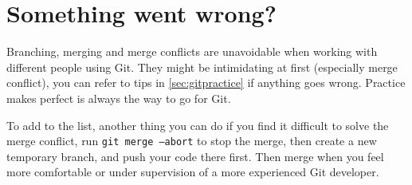 


\section{Something went wrong?}

Branching, merging and merge conflicts are unavoidable when working with different people using Git. They might be intimidating at first (especially merge conflict), you can refer to tips in \cref{sec:gitpractice} if anything goes wrong. Practice makes perfect is always the way to go for Git. 

To add to the list, another thing you can do if you find it difficult to solve the merge conflict, run \texttt{git merge --abort} to stop the merge, then create a new temporary branch, and push your code there first. Then merge when you feel more comfortable or under supervision of a more experienced Git developer.

